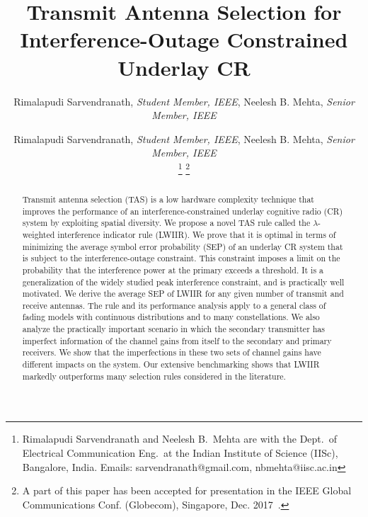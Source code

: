 \documentclass[12pt,draftcls,peerreview,onecolumn]{IEEEtran}
\begin{document}
\title{Transmit Antenna Selection for Interference-Outage Constrained Underlay CR}

\author{Rimalapudi Sarvendranath, {\it Student Member, IEEE}, Neelesh B. Mehta, {\it Senior Member, IEEE}}

\author{
	Rimalapudi Sarvendranath, {\it Student Member, IEEE}, Neelesh B. Mehta, {\it Senior Member, IEEE}
	
	\thanks{Rimalapudi Sarvendranath and Neelesh B.\ Mehta are with the
		Dept.\ of Electrical Communication Eng.\ at the Indian Institute of
		Science (IISc), Bangalore, India. Emails:
		sarvendranath@gmail.com, nbmehta@iisc.ac.in}
		\thanks{A part of this paper has been accepted for presentation in the IEEE Global
		Communications Conf. (Globecom), Singapore, Dec. 2017~\cite{sarvnedranath_2017_globecom}.}
}

\setcounter{page}{1}

\maketitle

\begin{abstract}
Transmit antenna selection (TAS) is a low hardware complexity technique that improves the performance of an interference-constrained underlay cognitive radio (CR) system by exploiting spatial diversity. We propose a novel TAS rule called the $\lambda$-weighted interference indicator rule (LWIIR). We prove that it is optimal in terms of minimizing the average symbol error probability (SEP) of an underlay CR system that is subject to the interference-outage constraint. This constraint imposes a limit on the probability that the interference power at the primary exceeds a threshold. It is a generalization of the widely studied peak interference constraint, and is practically well motivated. We derive the average SEP of LWIIR for any given number of transmit and receive antennas. The rule and its performance analysis apply to a general class of fading models with continuous distributions and to many constellations. We also analyze the practically important scenario in which the secondary transmitter has imperfect information of the channel gains from itself to the secondary and primary receivers. We show that the imperfections in these two sets of channel gains have different impacts on the system. Our extensive benchmarking shows that LWIIR markedly outperforms many selection rules considered in the literature.

\end{abstract}
\end{document}
